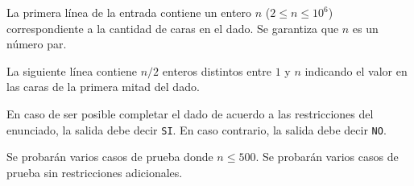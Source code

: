 \documentclass{oci}
\begin{document}
\begin{inputDescription}
  La primera línea de la entrada contiene un entero $n$ ($2 \leq n \leq 10^6$)
  correspondiente a la cantidad de caras en el dado.
  Se garantiza que $n$ es un número par.

  La siguiente línea contiene $n/2$ enteros distintos entre $1$ y $n$ indicando
  el valor en las caras de la primera mitad del dado.
\end{inputDescription}

\begin{outputDescription}
  En caso de ser posible completar el dado de acuerdo a las restricciones del enunciado,
  la salida debe decir \texttt{SI}. En caso contrario, la salida debe decir \texttt{NO}.
\end{outputDescription}

\begin{scoreDescription}
   Se probarán varios casos de prueba donde $n \leq 500$.
   Se probarán varios casos de prueba sin restricciones adicionales.
\end{scoreDescription}

\begin{sampleDescription}
\end{sampleDescription}
\end{document}
